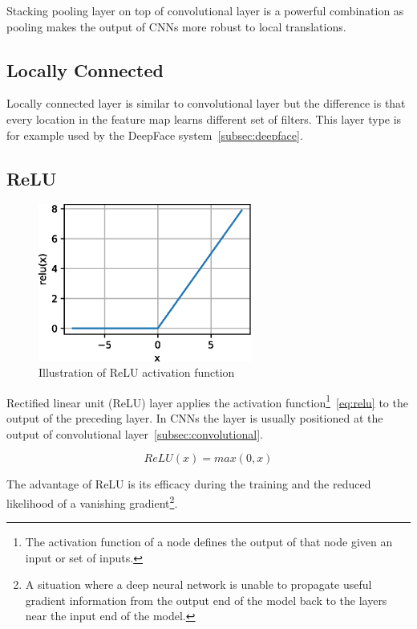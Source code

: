 Stacking pooling layer on top of convolutional layer is a powerful combination as pooling makes the output of CNNs
more robust to local translations\cite{DeepFace}.

\subsection{Locally Connected}\label{subsec:lclayer}
Locally connected layer is similar to convolutional layer but the difference is that every location in the feature map
learns different set of filters.
This layer type is for example used by the DeepFace system~\ref{subsec:deepface}.

\subsection{ReLU}\label{subsec:relu}

\begin{figure}
    \label{fig:relu}
    \includegraphics[width=7cm]{images/cnn/relu.eps}
    \caption{Illustration of ReLU activation function~\cite{ReLU}}
\end{figure}

Rectified linear unit (ReLU) layer applies the activation function\footnote{The activation
function of a node defines the output of that node given an input or set of inputs.}~\ref{eq:relu} to the output of
the preceding layer.
In CNNs the layer is usually positioned at the output of convolutional layer~\ref{subsec:convolutional}.

\begin{equation}
    \label{eq:relu}
    ReLU(x) = max(0,x)
\end{equation}

The advantage of ReLU is its efficacy during the training and the reduced likelihood of a vanishing
gradient\footnote{\label{foot:vangrad}A situation where a deep neural network is unable to propagate useful gradient
information from the output end of the model back to the layers near the input end of the model.}.

